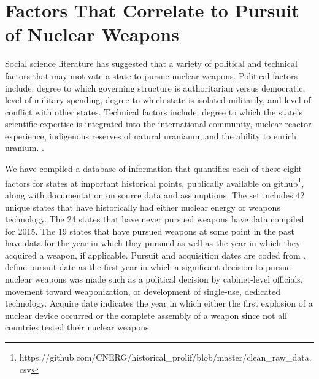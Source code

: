 \section{Factors That Correlate to Pursuit of Nuclear Weapons}
\label{s_factors}

Social science literature has suggested that a variety of political and technical factors that may motivate a state to pursue nuclear weapons. Political factors include: degree to which governing structure is authoritarian versus democratic, level of military spending, degree to which state is isolated militarily, and level of conflict with other states. Technical factors include: degree to which the state's scientific expertise is integrated into the international community, nuclear reactor experience, indigenous reserves of natural uraniaum, and the ability to enrich uranium\cite{hymans_2012}.  .

We have compiled a database of information that quantifies each of these eight factors for states at important historical points, publically available on github\footnote{https://github.com/CNERG/historical\_prolif/blob/master/clean\_raw\_data.csv}, along with documentation on source data and assumptions.  The set includes 42 unique states that have historically had either nuclear energy or weapons technology.  The 24 states that have never pursued weapons have data compiled for 2015. The 19 states that have pursued weapons at some point in the past have data for the year in which they pursued as well as the year in which they acquired a weapon, if applicable. Pursuit and acquisition dates are coded from .   define pursuit date as the first year in which a significant decision to pursue nuclear weapons was made such as a political decision by cabinet-level officials, movement toward weaponization, or development of single-use, dedicated technology.  Acquire date indicates the year in which either the first explosion of a nuclear device occurred or the complete assembly of a weapon since not all countries tested their nuclear weapons.

